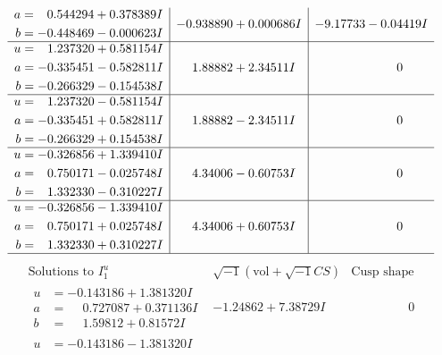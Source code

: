 \documentclass[1p]{elsarticle_modified}
\theoremstyle{definition}
\newcommand{\I}{\sqrt{-1}}
\begin{document}
$$\begin{array}{c|c|c}
\begin{aligned}
a &= \phantom{-}0.544294 + 0.378389 I \\
b &= -0.448469 - 0.000623 I\end{aligned}
 & -0.938890 + 0.000686 I & -9.17733 - 0.04419 I \\ \hline\begin{aligned}
u &= \phantom{-}1.237320 + 0.581154 I \\
a &= -0.335451 - 0.582811 I \\
b &= -0.266329 - 0.154538 I\end{aligned}
 & \phantom{-}1.88882 + 2.34511 I & \phantom{-0.000000 } 0 \\ \hline\begin{aligned}
u &= \phantom{-}1.237320 - 0.581154 I \\
a &= -0.335451 + 0.582811 I \\
b &= -0.266329 + 0.154538 I\end{aligned}
 & \phantom{-}1.88882 - 2.34511 I & \phantom{-0.000000 } 0 \\ \hline\begin{aligned}
u &= -0.326856 + 1.339410 I \\
a &= \phantom{-}0.750171 - 0.025748 I \\
b &= \phantom{-}1.332330 - 0.310227 I\end{aligned}
 & \phantom{-}4.34006 - 0.60753 I & \phantom{-0.000000 } 0 \\ \hline\begin{aligned}
u &= -0.326856 - 1.339410 I \\
a &= \phantom{-}0.750171 + 0.025748 I \\
b &= \phantom{-}1.332330 + 0.310227 I\end{aligned}
 & \phantom{-}4.34006 + 0.60753 I & \phantom{-0.000000 } 0\\
 \hline 
 \end{array}$$\newpage$$\begin{array}{c|c|c}  
\text{Solutions to }I^u_{1}& \I (\text{vol} + \sqrt{-1}CS) & \text{Cusp shape}\\
 \hline 
\begin{aligned}
u &= -0.143186 + 1.381320 I \\
a &= \phantom{-}0.727087 + 0.371136 I \\
b &= \phantom{-}1.59812 + 0.81572 I\end{aligned}
 & -1.24862 + 7.38729 I & \phantom{-0.000000 } 0 \\ \hline\begin{aligned}
u &= -0.143186 - 1.381320 I \\

\end{aligned}
\end{array}$$
\end{document}
